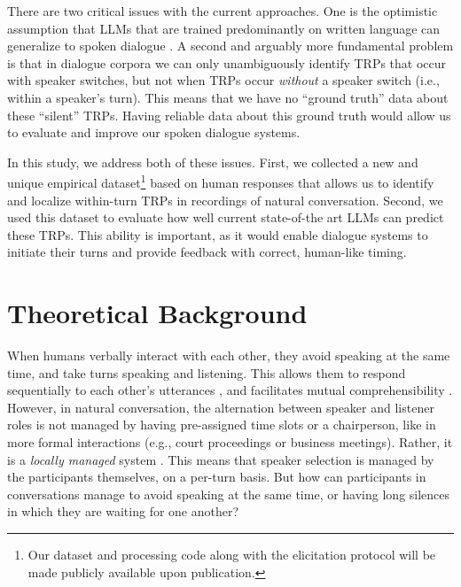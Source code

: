 There are two critical issues with the current approaches. One is the optimistic assumption that LLMs that are trained predominantly on written language can generalize to spoken dialogue \citep{MAHOWALD2024}. A second and arguably more fundamental problem is that in dialogue corpora we can only unambiguously identify TRPs that occur with speaker switches, but not when TRPs occur \textit{without} a speaker switch (i.e., within a speaker's turn). This means that we have no ``ground truth'' data about these ``silent'' TRPs. Having reliable data about this ground truth would allow us to evaluate and improve our spoken dialogue systems.

In this study, we address both of these issues. First, we collected a new and unique empirical dataset\footnote{Our dataset and processing code along with the elicitation protocol will be made publicly available upon publication.} based on human responses that allows us to identify and localize within-turn TRPs in recordings of natural conversation. Second, we used this dataset to evaluate how well current state-of-the art LLMs can predict these TRPs. This ability is important, as it would enable dialogue systems to initiate their turns and provide feedback with correct, human-like timing.


\section{Theoretical Background}

When humans verbally interact with each other, they avoid speaking at the same time, and take turns speaking and listening. This allows them to respond sequentially to each other's utterances \citep{stivers2009universals, deRuiter2019TurnTaking}, and facilitates mutual comprehensibility \citep{Duncan1972SomeSignals}. However, in natural conversation, the alternation between speaker and listener roles is not managed by having pre-assigned time slots or a chairperson, like in more formal interactions (e.g., court proceedings or business meetings). Rather, it is a \textit{locally managed} system \citep*{sacks1974simplest}. This means that speaker selection is managed by the participants themselves, on a per-turn basis. But how can participants in conversations manage to avoid speaking at the same time, or having long silences in which they are waiting for one another?


